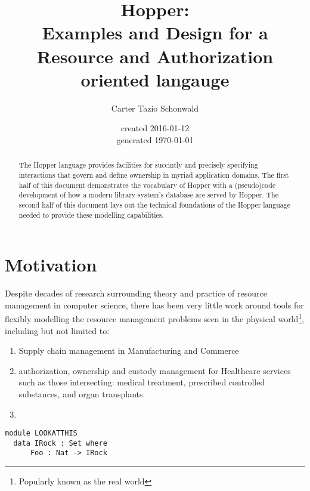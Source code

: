 \documentclass[letterpaper,11pt,reqno]{amsart}
\newcommand{\now}{\fullisodate
  \today  \usdate}
\theoremstyle{plain}
\theoremstyle{definition}
\theoremstyle{remark}
\begin{document}
\title{Hopper:\\ Examples and Design for a Resource and Authorization oriented langauge}
\author{Carter Tazio Schonwald}
\date{created 2016-01-12\\generated \now}
\begin{abstract}
The Hopper language provides facilities for succintly and precisely specifying interactions that govern and define ownership in myriad application domains.
The first half of this document demonstrates the vocabulary of Hopper with a (pseudo)code development of how a modern library system's database are served by Hopper.
The second half of this document lays out the technical foundations of the Hopper language
needed to provide these modelling capabilities.

\end{abstract}


\maketitle

\todototoc
\makeatletter
\providecommand\@dotsep{5}
\makeatother
\listoftodos\relax


\section{Motivation} Despite decades of research surrounding theory and practice of resource management in computer science, %
there has been very little work around tools for flexibly modelling the resource management problems
seen in the physical world\footnote{Popularly known as the real world\texttrademark}, including but not limited to:
\begin{enumerate}
  \item Supply chain management in Manufacturing and Commerce
  \item authorization, ownership and custody management for Healthcare services such as those intersecting: medical treatment, prescribed controlled substances, and organ transplants. 
  \item
\end{enumerate}

\begin{verbatim}
module LOOKATTHIS
  data IRock : Set where
      Foo : Nat -> IRock

\end{verbatim}
\end{document}
